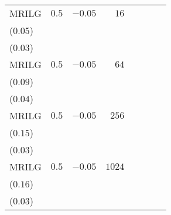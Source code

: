\begin{table}[t]
\begin{tabular}{lrrrrrrr}
MRILG & \(0.5\) & \(-0.05\) & \(16\) & \longcell{\(0.07\)\\{\tiny(\(0.05\))}} & \longcell{\(0.03\)\\{\tiny(\(0.03\))}} \\[2.2ex]
MRILG & \(0.5\) & \(-0.05\) & \(64\) & \longcell{\(0.17\)\\{\tiny(\(0.09\))}} & \longcell{\(0.05\)\\{\tiny(\(0.04\))}} \\[2.2ex]
MRILG & \(0.5\) & \(-0.05\) & \(256\) & \longcell{\(0.28\)\\{\tiny(\(0.15\))}} & \longcell{\(0.06\)\\{\tiny(\(0.03\))}} \\[2.2ex]
MRILG & \(0.5\) & \(-0.05\) & \(1024\) & \longcell{\(0.31\)\\{\tiny(\(0.16\))}} & \longcell{\(0.06\)\\{\tiny(\(0.03\))}} \\
\bottomrule
\end{tabular}
\end{table}
